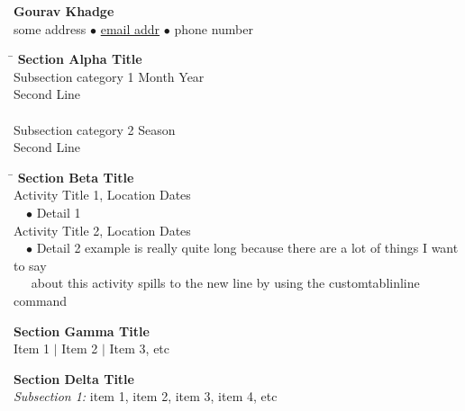 \documentclass[12pt]{article}
\newcommand{\name}{\large\textbf{Gourav Khadge}} %
\newcommand{\addr}{some address}
\newcommand{\email}{\url{email addr}}
\newcommand{\phone}{phone number }
\newcommand{\aligndates}{\hspace*{6.5in}}
\newcommand{\headerdot}{  $\bullet$  }
\newcommand{\vb}{ $\mid$ }
\newcommand{\sectionNL}{\\[2pt]}
\newcommand{\customtab}{$\hspace{10pt}\bullet\hspace{2pt}$}
\newcommand{\customtabinline}{$\hspace{17pt}$}
\begin{document}
\begin{center}
\name \\
\addr \headerdot \email \headerdot \phone
\end{center}

\begin{tabbing}
\aligndates\= \kill
{\large \textbf{Section Alpha Title} } \> \sectionNL
Subsection category 1 \> Month Year \\
Second Line \> \\ \\

Subsection category 2 \> Season \\
Second Line \> 
\end{tabbing}


\begin{tabbing} 
\hspace*{6.5in}\= \kill
{\large \textbf{Section Beta Title} } \> \sectionNL
Activity Title 1, Location \>Dates \\
\customtab Detail 1 \\

Activity Title 2, Location \>Dates \\
\customtab Detail 2 example is really quite long because there are a lot of things I want to say \\ \customtabinline about this activity spills to the new line by using the customtablinline command
\end{tabbing}

\begin{flushleft}
{\large \textbf{Section Gamma Title }} \sectionNL
Item 1 \vb Item 2 \vb Item 3, etc 
\end{flushleft}

\begin{flushleft}
{\large \textbf{Section Delta Title}} \sectionNL
\textit{Subsection 1:} item 1, item 2, item 3, item 4, etc
\end{flushleft}


\end{document}
